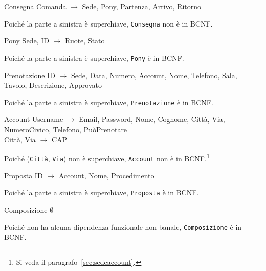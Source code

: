 \begin{samepage}
\begin{funcdep}{Consegna}
    Comanda $\to$ Sede, Pony, Partenza, Arrivo, Ritorno
\end{funcdep}
Poiché la parte a sinistra è superchiave, {\tt Consegna} non è in BCNF.
\end{samepage}

\begin{samepage}
\begin{funcdep}{Pony}
    Sede, ID $\to$ Ruote, Stato
\end{funcdep}
Poiché la parte a sinistra è superchiave, {\tt Pony} è in BCNF.
\end{samepage}

\begin{samepage}
\begin{funcdep}{Prenotazione}
    ID $\to$ Sede, Data, Numero, Account, Nome, Telefono, Sala,\\
        \indent\indent\indent\indent\indent Tavolo, Descrizione, Approvato
\end{funcdep}
Poiché la parte a sinistra è superchiave, {\tt Prenotazione} è in BCNF.
\end{samepage}

\begin{samepage}
\begin{funcdep}{Account}
    Username $\to$ Email, Password, Nome, Cognome, Città, Via,\\
        \indent\indent\indent\indent\indent NumeroCivico, Telefono, PuòPrenotare\\
    Città, Via $\to$ CAP
\end{funcdep}
Poiché ({\tt Città}, {\tt Via}) non è superchiave, {\tt Account} non
è in BCNF.\footnote{Si veda il paragrafo~\vref{sec:sedeaccount}.}
\end{samepage}

\begin{samepage}
\begin{funcdep}{Proposta}
    ID $\to$ Account, Nome, Procedimento
\end{funcdep}
Poiché la parte a sinistra è superchiave, {\tt Proposta} è in BCNF.
\end{samepage}

\begin{samepage}
\begin{funcdep}{Composizione}
    $\emptyset$
\end{funcdep}
Poiché non ha alcuna dipendenza funzionale non banale, {\tt Composizione} è in BCNF.
\end{samepage}

